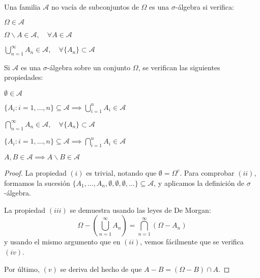 \begin{ndef} Una familia $\mathscr A$ no vacía de subconjuntos de $\Omega$ es una \mbox{$\sigma$-álgebra} si verifica:

  \begin{nlist}
  \item $\Omega \in \mathscr A$
  \item $\displaystyle \Omega \backslash A \in \mathscr A, \quad \forall A \in \mathscr A$
  \item $\displaystyle \bigcup_{n=1}^\infty A_n \in \mathscr A, \quad \forall \{A_n\} \subset \mathscr A$
  \end{nlist}

\end{ndef}

\begin{nprop}
  Si $\mathscr A$ es una $\sigma$-álgebra sobre un conjunto $\Omega$, se verifican las siguientes propiedades:

  \begin{nlist}
  \item $\emptyset \in \mathscr A$
  \item $\displaystyle \{A_i : i = 1,\dots,n\} \subseteq \mathscr A \implies \bigcup_{i=1}^n A_i \in \mathscr A$
  \item $\displaystyle \bigcap_{n=1}^\infty A_n \in \mathscr A, \quad \forall \{A_n\} \subset \mathscr A$
  \item $\displaystyle \{A_i : i = 1,\dots,n\} \subseteq \mathscr A \implies \bigcap_{i=1}^n A_i \in \mathscr A$
  \item $A,B \in \mathscr A \implies A \backslash B \in \mathscr A$
  \end{nlist}
\end{nprop}

  \begin{proof}
    La propiedad $(i)$ es trivial, notando que $\emptyset = \Omega^c$. Para comprobar $(ii)$, formamos la sucesión $\{A_1,\dots,A_n,\emptyset,\emptyset, \emptyset, \dots\} \subseteq \mathscr A$, y aplicamos la definición de $\sigma$-álgebra.

    La propiedad $(iii)$ se demuestra usando las leyes de De Morgan: $$\Omega - \left( \bigcup_{n=1}^\infty A_n \right) = \bigcap_{n=1}^\infty (\Omega - A_n)$$ y usando el mismo argumento que en $(ii)$, vemos fácilmente que se verifica $(iv)$.

    Por último, $(v)$ se deriva del hecho de que $A - B = (\Omega - B) \cap A$.
  \end{proof}

